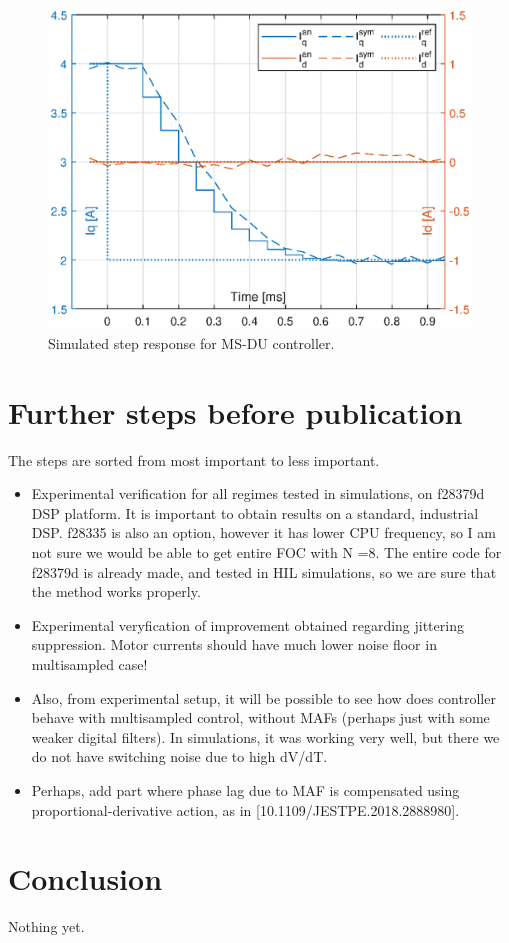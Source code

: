 \documentclass[journal]{IEEEtran}
\begin{document}
\begin{figure}[t!]
    \centerline{\includegraphics[width=0.95\linewidth]{figures/MSDU_step.eps}}
    \caption{Simulated step response for MS-DU controller.}
    \label{fig:MSDU_step} 
\end{figure}


\section{Further steps before publication}
The steps are sorted from most important to less important.
\begin{itemize}
\item{Experimental verification for all regimes tested in simulations, on f28379d DSP platform. It is important to obtain results on a standard, industrial DSP. f28335 is also an option, however it has lower CPU frequency, so I am not sure we would be able to get entire FOC with N =8. The entire code for f28379d is already made, and tested in HIL simulations, so we are sure that the method works properly.}
\item{Experimental veryfication of improvement obtained regarding jittering suppression. Motor currents should have much lower noise floor in multisampled case!}
\item{Also, from experimental setup, it will be possible to see how does controller behave with multisampled control, without MAFs (perhaps just with some weaker digital filters). In simulations, it was working very well, but there we do not have switching noise due to high dV/dT.}
\item{Perhaps, add part where phase lag due to MAF is compensated using proportional-derivative action, as in [10.1109/JESTPE.2018.2888980].}
\end{itemize}

\section{Conclusion}
Nothing yet.

\ifCLASSOPTIONcaptionsoff
  \newpage
\fi



\end{document}
